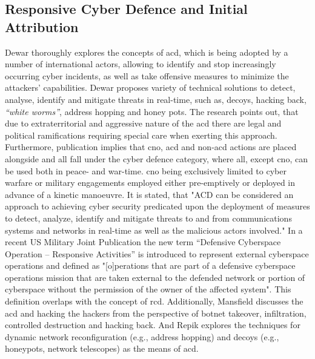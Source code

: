 \subsection{Responsive Cyber Defence and Initial Attribution}
\label{sec:rcd-work}
\glsresetall
Dewar \cite{Dewar2017} thoroughly explores the concepts of \gls{acd}, which is being adopted by a number of international actors, allowing to identify and stop increasingly occurring cyber incidents, as well as take offensive measures to minimize the attackers' capabilities. Dewar proposes variety of technical solutions to detect, analyse, identify and mitigate threats in real-time, such as, decoys, hacking back, \textit{``white worms''}, address hopping and honey pots. The research points out, that due to extraterritorial and aggressive nature of the \gls{acd} there are legal and political ramifications requiring special care when exerting this approach. Furthermore, publication implies that \gls{cno}, \gls{acd} and non-\gls{acd} actions are placed alongside and all fall under the cyber defence category, where all, except \gls{cno}, can be used both in peace- and war-time. \gls{cno} being exclusively limited to cyber warfare or military engagements employed either pre-emptively or deployed in advance of a kinetic manoeuvre. It is stated, that "ACD can be considered an approach to achieving cyber security predicated upon the deployment of measures to detect, analyze, identify and mitigate threats to and from communications systems and networks in real-time as well as the malicious actors involved." \cite{Dewar2017}
%
In a recent US Military Joint Publication \cite{USJCS2018} the new term ``Defensive Cyberspace Operation -- Responsive Activities'' is introduced to represent external cyberspace operations and defined as "[o]perations that are part of a defensive cyberspace operations mission that are taken external to the defended network or portion of cyberspace without the permission of the owner of the affected system". This definition overlaps with the concept of \gls{rcd}.
Additionally, Mansfield \cite{Mansfield2009} discusses the \gls{acd} and hacking the hackers from the perspective of botnet takeover, infiltration, controlled destruction and hacking back.
And Repik \cite{Repik2008} explores the techniques for dynamic network reconfiguration (e.g., address hopping) and decoys (e.g., honeypots, network telescopes) as the means of \gls{acd}.

